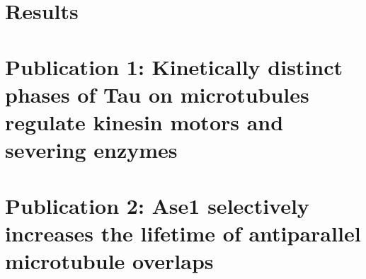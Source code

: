 \documentclass[11pt]{book}
\begin{document}
\begin{frontmatter}
\hypersetup{linkcolor=black}


%

\AddToc%
\AddLof%
\AddLot%
\end{frontmatter}





\chapter{Results}





	
\printbibliography[heading=bibintoc, title={References}]


\appendix
\addappheadtotoc
\renewcommand{\thefigure}{A.\arabic{figure}}
\setcounter{figure}{0}

\appendixpage
\chapter{Publication 1: Kinetically distinct phases of Tau on microtubules regulate kinesin motors and severing enzymes}


\chapter{Publication 2: Ase1 selectively increases the lifetime of antiparallel microtubule overlaps}

\end{document}
